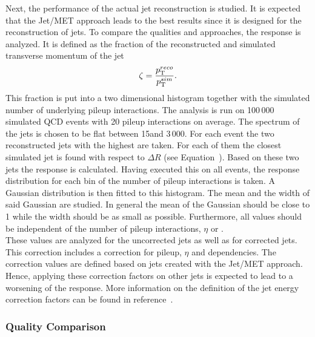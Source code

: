 Next, the performance of the actual jet reconstruction is studied. It is expected that the Jet/MET approach leads to the best results since it is designed for the reconstruction of jets. To compare the qualities and approaches, the \pt{} response is analyzed. It is defined as the fraction of the reconstructed and simulated transverse momentum of the jet
\begin{equation}
\zeta = \frac{p_{\mathrm{T}}^{reco}}{p_{\mathrm{T}}^{sim}}.
\label{eq:OOPtResponse}
\end{equation}
This fraction is put into a two dimensional histogram together with the simulated number of underlying pileup interactions. The analysis is run on 100\,000 simulated QCD events with 20 pileup interactions on average. The spectrum of the jets \pt is chosen to be flat between 15\GeV and 3\,000\GeV{}. For each event the two reconstructed jets with the highest \pt are taken. For each of them the closest simulated jet is found with respect to $\Delta{}R$ (see Equation~). Based on these two jets the \pt{} response is calculated. Having executed this on all events, the \pt{} response distribution for each bin of the number of pileup interactions is taken. A Gaussian distribution is then fitted to this histogram. The mean and the width of said Gaussian are studied. In general the mean of the Gaussian should be close to 1 while the width should be as small as possible. Furthermore, all values should be independent of the number of pileup interactions, $\eta$ or \pt{}. \\
These values are analyzed for the uncorrected jets as well as for corrected jets. This correction includes a correction for pileup, $\eta$ and \pt dependencies. The correction values are defined based on jets created with the Jet/MET approach. Hence, applying these correction factors on other jets is expected to lead to a worsening of the \pt{} response. More information on the definition of the jet energy correction factors can be found in reference~.

\subsubsection{Quality Comparison \label{sec:OOJetsPtResponseQuality} }

